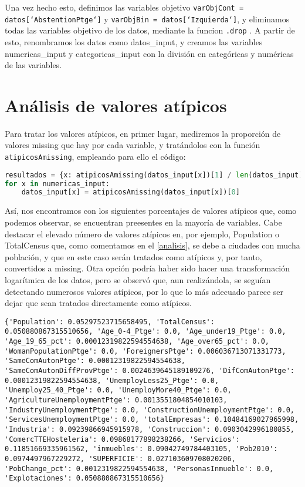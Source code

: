 \documentclass[a4paper,onecolumn]{extarticle}
\let\stdsection\section
\renewcommand\section{\newpage\stdsection}
\begin{document}
\begin{sloppypar}
Una vez hecho esto, definimos las variables objetivo \texttt{varObjCont = datos[`AbstentionPtge`]} y \texttt{varObjBin = datos[`Izquierda`]}, y eliminamos
todas las variables objetivo de los datos, mediante la funcion \texttt{.drop} . A partir de esto, renombramos los datos como datos\_input, y creamos las 
variables numericas\_input y categoricas\_input con la división en categóricas y numéricas de las variables.

\section{Análisis de valores atípicos}\label{atipicos}
Para tratar los valores atípicos, en primer lugar, mediremos la proporción de valores missing que hay por cada variable, y tratándolos con la función 
\texttt{atipicosAmissing}, empleando para ello el código:
\begin{lstlisting}[language=Python]
resultados = {x: atipicosAmissing(datos_input[x])[1] / len(datos_input) for x in numericas_input}
for x in numericas_input:
    datos_input[x] = atipicosAmissing(datos_input[x])[0]
\end{lstlisting}
Así, nos encontramos con los siguientes porcentajes de valores atípicos que, como podemos observar, se encuentran preesentes en la mayoría de variables. Cabe 
destacar el elevado número de valores atípicos en, por ejemplo, Population o TotalCensus que, como comentamos en el \ref{analisis}, se debe a ciudades con 
mucha población, y que en este caso serán tratados como atípicos y, por tanto, convertidos a missing. Otra opción podría haber sido hacer una transformación 
logarítmica de los datos, pero se observó que, aun realizándola, se seguían detectando numerosos valores atípicos, por lo que lo más adecuado parece ser 
dejar que sean tratados directamente como atípicos.
\begin{lstlisting}[numbers=none]
{'Population': 0.05297523715658495, 'TotalCensus': 0.050880867315510656, 'Age_0-4_Ptge': 0.0, 'Age_under19_Ptge': 0.0, 'Age_19_65_pct': 0.00012319822594554638, 'Age_over65_pct': 0.0, 'WomanPopulationPtge': 0.0, 'ForeignersPtge': 0.006036713071331773, 'SameComAutonPtge': 0.00012319822594554638, 'SameComAutonDiffProvPtge': 0.0024639645189109276, 'DifComAutonPtge': 0.00012319822594554638, 'UnemployLess25_Ptge': 0.0, 'Unemploy25_40_Ptge': 0.0, 'UnemployMore40_Ptge': 0.0, 'AgricultureUnemploymentPtge': 0.0013551804854010103, 'IndustryUnemploymentPtge': 0.0, 'ConstructionUnemploymentPtge': 0.0, 'ServicesUnemploymentPtge': 0.0, 'totalEmpresas': 0.10484169027965998, 'Industria': 0.09239866945915978, 'Construccion': 0.0903042996180855, 'ComercTTEHosteleria': 0.09868177898238266, 'Servicios': 0.11851669335961562, 'inmuebles': 0.09042749784403105, 'Pob2010': 0.0974497967229272, 'SUPERFICIE': 0.027103609708020206, 'PobChange_pct': 0.0012319822594554638, 'PersonasInmueble': 0.0, 'Explotaciones': 0.050880867315510656}
\end{lstlisting}


\end{sloppypar}
\end{document}

